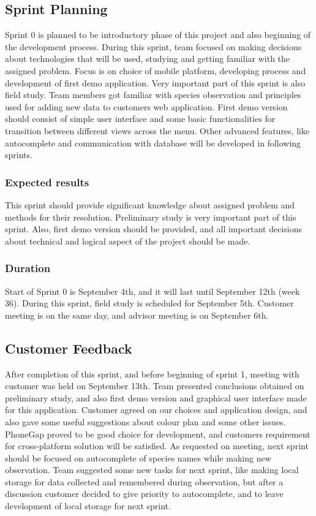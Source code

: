 \subsection{Sprint Planning}
	Sprint 0 is planned to be introductory phase of this project and also beginning of the development process. During this sprint, team focused on making decisions about technologies that will be used, studying and getting familiar with the assigned problem. Focus is on choice of mobile platform, developing process and development of first demo application. Very important part of this sprint is also field study. Team members got familiar with species observation and principles used for adding new data to customers web application.\newline
	First demo version should consist of simple user interface and some basic functionalities for transition between different views across the menu. Other advanced features, like autocomplete and communication with database will be developed in following sprints.
	
	\subsubsection{Expected results}
	This sprint should provide significant knowledge about assigned problem and methods for their resolution. Preliminary study is very important part of this sprint. Also, first demo version should be provided, and all important decisions about technical and logical aspect of the project should be made.
	
	\subsubsection{Duration}
	Start of Sprint 0 is September 4th, and it will last until September 12th (week 36). During this sprint, field study is scheduled for September 5th. Customer meeting is on the same day, and advisor meeting is on September 6th.
	
	
	
\subsection{Customer Feedback}
	After completion of this sprint, and before beginning of sprint 1, meeting with customer was held on September 13th. Team presented conclusions obtained on preliminary study, and also first demo version and graphical user interface made for this application. Customer agreed on our choices and application design, and also gave some useful suggestions about colour plan and some other issues. PhoneGap proved to be good choice for development, and customers requirement for cross-platform solution will be satisfied.\newline
	As requested on meeting, next sprint should be focused on autocomplete of species names while making new observation. Team suggested some new tasks for next sprint, like making local storage for data collected and remembered during observation, but after a discussion customer decided to give priority to autocomplete, and to leave development of local storage for next sprint.
	
